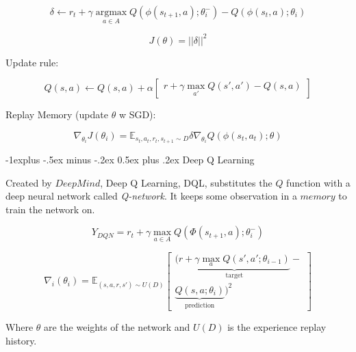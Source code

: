 \documentclass[10pt,landscape]{article}
\makeatletter
\renewcommand{\subsection}{\@startsection{subsection}{2}{0mm}%
                                {-1explus -.5ex minus -.2ex}%
                                {0.5ex plus .2ex}%
                                {\normalfont\normalsize\bfseries}}
\DeclareMathOperator*{\argmax}{argmax}
\makeatother
\begin{document}
\begin{multicols}{3}
\begin{equation*}
    \delta \leftarrow r_{t} + \gamma \argmax\limits_{a \in A} Q(\phi(s_{t+1},a); \theta_{i}^{-}) - Q(\phi(s_{t},a); \theta_{i})
\end{equation*}

\begin{equation*}
    J(\theta) = ||\delta||^{2}
\end{equation*}

Update rule:

\begin{equation*}
    Q(s,a) \leftarrow Q(s,a) + \alpha  \begin{bmatrix}r +  \gamma \max\limits_{a'}Q(s',a') - Q(s,a)\end{bmatrix}
\end{equation*}

Replay Memory (update $\theta$ w\/ SGD):

\begin{equation*}
    \nabla_{\theta_{i}}J(\theta_{i}) = \mathbb{E}_{s_{t},a_{t},r_{t},s_{t+1} \sim D} \delta \nabla_{\theta_{i}}Q(\phi(s_{t},a_{t}); \theta)
\end{equation*}

\subsection{Deep Q Learning}

Created by $DeepMind$, Deep Q Learning, DQL, substitutes the $Q$
function with a deep neural network called \emph{Q-network}.
It keeps some observation in a $memory$ to train the network on.

\begin{equation*}
    Y_{DQN} = r_t + \gamma \max\limits_{a \in A} Q(\Phi(s_{t+1},a); \theta_i^{-})
\end{equation*}

\begin{equation}
\nabla_{i}(\theta_{i}) = \mathbb{E}_{(s, a, r, s') \sim U(D)}
\begin{bmatrix}
        ( \underbrace{r + \gamma \max\limits_{a} Q(s',a'; \theta_{i-1})}_\text{target} - \\
        \underbrace{Q(s,a;\theta_i)}_\text{prediction})^2
\end{bmatrix}
\end{equation}

Where $\theta$ are the weights of the network and $U(D)$ is the experience replay history.


\end{multicols}
\end{document}
